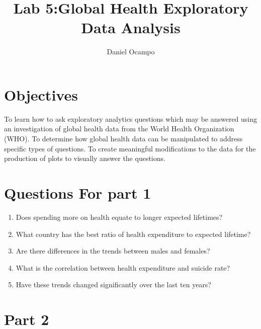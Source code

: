 \documentclass[11pt]{article}
\begin{document}
%
\author{Daniel Ocampo}
\title{Lab 5:Global Health Exploratory Data Analysis}
\maketitle

\section{Objectives}

To learn how to ask exploratory analytics questions which may be answered using an investigation
of global health data from the World Health Organization (WHO). To determine how global health
data can be manipulated to address specific types of questions. To create meaningful modifications
to the data for the production of plots to visually answer the questions.


\section{Questions For part 1}
\begin{enumerate}
    \item Does spending
more on health equate to longer
expected lifetimes?

\item What country has the best ratio of health expenditure to
expected lifetime?
 \item Are there
differences in
the trends between males
and females?
\item What is the
correlation between health
expenditure and suicide rate?

\item Have these trends changed significantly over the last
ten years?



\end{enumerate}

\section{ Part 2}
\end{document}
